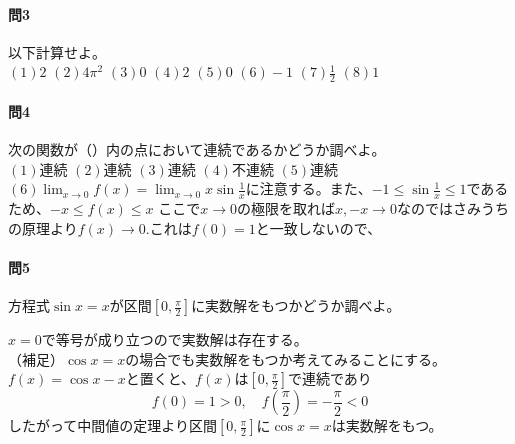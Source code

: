 \documentclass[a4j,dvipdfmx]{jsarticle}
\begin{document}
                \paragraph{問3}以下計算せよ。\\

                \noindent
                $(1)2$\hspace{3mm}
                $(2)4\pi^2$\hspace{3mm}
                $(3)0$\hspace{3mm}
                $(4)2$\hspace{3mm}
                $(5)0$\hspace{3mm}
                $(6)-1$\hspace{3mm}
                $(7)\frac{1}{2}$\hspace{3mm}
                $(8)1$
                
                \paragraph{問4}次の関数が（）内の点において連続であるかどうか調べよ。\\
                $(1)$連続\hspace{1mm}
                $(2)$連続\hspace{1mm}
                $(3)$連続\hspace{1mm}
                $(4)$不連続\hspace{1mm}
                $(5)$連続\\
                $(6)\displaystyle \lim_{x\to 0}f(x)=\lim_{x\to 0}x\sin\frac{1}{x}$に注意する。また、$-1\leq\sin\frac{1}{x}\leq 1$であるため、$-x\leq f(x) \leq x$
                ここで$x\to 0$の極限を取れば$x,-x\to 0$なのではさみうちの原理より$f(x)\to 0.$これは$f(0)=1$と一致しないので、

                \paragraph{問5}方程式$\sin x=x$が区間$[0,\frac{\pi}{2}]$に実数解をもつかどうか調べよ。

                $x=0$で等号が成り立つので実数解は存在する。\\
                （補足）$\cos x=x$の場合でも実数解をもつか考えてみることにする。
                $f(x)=\cos x-x$と置くと、$f(x)$は$[0,\frac{\pi}{2}]$で連続であり
                \begin{equation*}
                    f(0)=1>0,\quad f\left(\frac{\pi}{2}\right)=-\frac{\pi}{2}<0
                \end{equation*}
                したがって中間値の定理より区間$[0,\frac{\pi}{2}]$に$\cos x=x$は実数解をもつ。
        \clearpage
\end{document}
